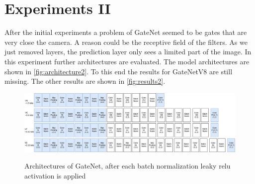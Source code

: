 \documentclass{article}
\begin{document}
\section{Experiments II}

After the initial experiments a problem of GateNet seemed to be gates that are very close the camera. A reason could be the receptive field of the filters. As we just removed layers, the prediction layer only sees a limited part of the image. In this experiment further architectures are evaluated. The model architectures are shown in \autoref{fig:architecture2}. To this end the results for GateNetV8 are still missing. The other results are shown in \autoref{fig:results2}.


\begin{figure}
	\centering
	\includegraphics[width=0.9\linewidth]{fig/architecture2}
	\label{fig:architecture2}
	\caption{Architectures of GateNet, after each batch normalization leaky relu activation is applied}
\end{figure}
\end{document}
